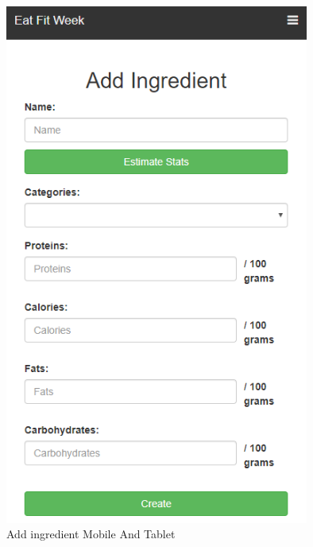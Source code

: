 \documentclass[12pt, a4paper, twoside]{book}
\begin{document}
	\begin{figure}[H]
		\centering
		\includegraphics[width=10cm]{Imagenes/MU-AddIngredientMobileTablet.png}
		\caption{Add ingredient Mobile And Tablet}\label{Add ingredient Mobile And Tablet}
	\end{figure}
\end{document}
